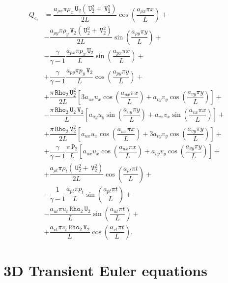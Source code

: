 \documentclass[10pt]{article}
\newcommand{\Rho}{\,\mathtt{Rho}}
\newcommand{\PP}{\,\mathtt{P}}
\newcommand{\U}{\,\mathtt{U}}
\newcommand{\V}{\,\mathtt{V}}
\begin{document}
\begin{equation}
 \begin{split}\label{eq:source_e_2d}
Q_{e_t} &=\dfrac{ a_{\rho x} \pi \rho_x  \U_2 (\U_2^2+\V_2^2)}{2L}\cos\left(\dfrac{a_{\rho x} \pi x}{L}\right)+\\
&-\dfrac{ a_{\rho y} \pi \rho_y \V_2 (\U_2^2+\V_2^2) }{2L}\sin\left(\dfrac{a_{\rho y} \pi y}{L}\right) +\\
&-\dfrac{\gamma}{\gamma-1}\dfrac{a_{px} \pi p_x  \U_2}{L}\sin\left(\dfrac{a_{px} \pi x}{L}\right) +\\
&+  \dfrac{\gamma}{\gamma-1}\dfrac{a_{py}\pi p_y  \V_2}{L}\cos\left(\dfrac{a_{py} \pi y}{L}\right)+\\
&+ \dfrac{ \pi \Rho_2 \U_2^2}{2L}\left[3 a_{ux} u_x \cos\left(\dfrac{a_{ux} \pi x}{L}\right)+a_{vy} v_y \cos\left(\dfrac{a_{vy} \pi y}{L}\right)\right]+\\
&-\dfrac{\pi \Rho_2 \U_2 \V_2}{L}\left[a_{uy} u_y \sin\left(\dfrac{a_{uy} \pi y}{L}\right)+a_{vx}  v_x\sin\left(\dfrac{a_{vx} \pi x}{L}\right)\right] +\\
&+\dfrac{\pi \Rho_2 \V_2^2}{2L} \left[a_{ux} u_x \cos\left(\dfrac{a_{ux} \pi x}{L}\right)+3 a_{vy} v_y \cos\left(\dfrac{a_{vy} \pi y}{L}\right)\right] +\\
&+ \dfrac{\gamma}{\gamma-1}\dfrac{\pi \PP_2}{L}\left[a_{ux} u_x \cos\left(\dfrac{a_{ux} \pi x}{L}\right)+a_{vy} v_y \cos\left(\dfrac{a_{vy} \pi y}{L}\right)\right]+\\
&+\dfrac{  a_{\rho t} \pi \rho_t (\U_2^2+\V_2^2)}{2L}\cos\left(\dfrac{a_{\rho t} \pi t}{L}\right)+\\
&-\dfrac{1}{\gamma-1}\dfrac{a_{pt} \pi p_t }{L}\sin\left(\dfrac{a_{pt} \pi t}{L}\right) +\\
&-\dfrac{a_{ut} \pi u_t \Rho_2 \U_2 }{L}\sin\left(\dfrac{a_{ut} \pi t}{L}\right)+\\
&+\dfrac{a_{vt} \pi v_t \Rho_2 \V_2 }{L}\cos\left(\dfrac{a_{vt} \pi t}{L}\right).
 \end{split}
\end{equation}



\section{3D Transient Euler equations}
\end{document}
